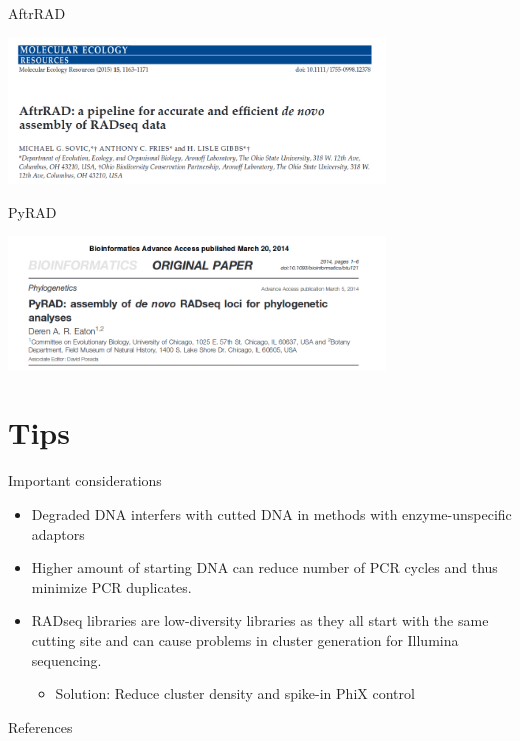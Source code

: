 \documentclass[presentation]{beamer}
\begin{document}
\begin{frame}[label=sec-4-1-9]{AftrRAD}
\begin{center}

\includegraphics[width=10cm]{AftrRAD.png}

\end{center}
\end{frame}

\begin{frame}[label=sec-4-1-10]{PyRAD}
\begin{center}

\includegraphics[width=10cm]{PyRAD.png}

\end{center}
\end{frame}
\section{Tips}
\label{sec-5}
\begin{frame}[label=sec-5-0-1]{Important considerations}
\begin{itemize}
\item Degraded DNA interfers with cutted DNA in methods with enzyme-unspecific adaptors
\item Higher amount of starting DNA can reduce number of PCR cycles and
thus minimize PCR duplicates.
\item RADseq libraries are low-diversity libraries as they all start with
the same cutting site and can cause problems in cluster generation
for Illumina sequencing.
\begin{itemize}
\item Solution: Reduce cluster density and spike-in PhiX control
\end{itemize}
\end{itemize}
\end{frame}
\begin{frame}[allowframebreaks]{References}
\raggedright
\printbibliography[sorting=nty,heading=bibnumbered]
\end{frame}
\end{document}
